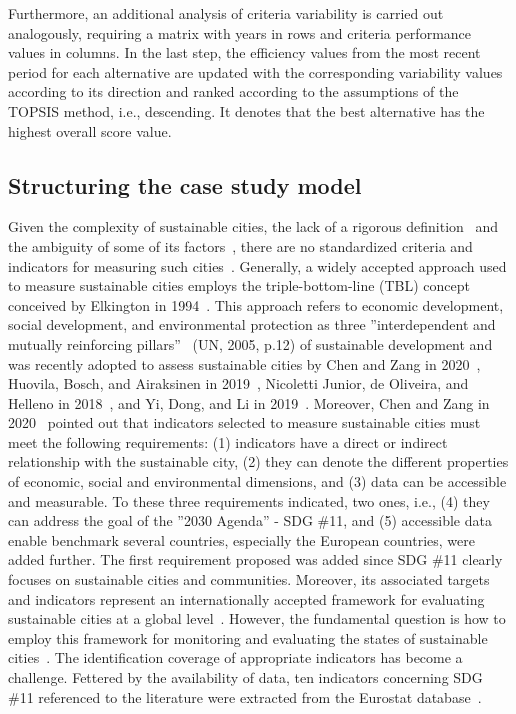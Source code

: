 \documentclass[5p,times]{elsarticle}
\begin{document}
Furthermore, an additional analysis of criteria variability is carried out analogously, requiring a matrix with years in rows and criteria performance values in columns. In the last step, the efficiency values from the most recent period for each alternative are updated with the corresponding variability values according to its direction and ranked according to the assumptions of the TOPSIS method, i.e., descending. It denotes that the best alternative has the highest overall score value.

\subsection{Structuring the case study model}
\label{sec:structuringEurostat}
%
Given the complexity of sustainable cities, the lack of a rigorous definition~\cite{hassan2015paradox} and the ambiguity of some of its factors~\cite{bouzguenda2019towards, phillis2017urban}, there are no standardized criteria and indicators for measuring such cities~\cite{chen2020evaluation}. Generally, a widely accepted approach used to measure sustainable cities employs the triple-bottom-line (TBL) concept conceived by Elkington in 1994~\cite{sitnikov2013triple}. This approach refers to economic development, social development, and environmental protection as three ''interdependent and mutually reinforcing pillars''~\cite{un2005} (UN, 2005, p.12) of sustainable development and was recently adopted to assess sustainable cities by Chen and Zang in 2020~\cite{chen2020evaluation}, Huovila, Bosch, and Airaksinen in 2019~\cite{huovila2019comparative},  Nicoletti Junior, de Oliveira, and Helleno in 2018~\cite{junior2018sustainability}, and Yi, Dong, and Li in 2019~\cite{yi2019evaluation}. Moreover, Chen and Zang in 2020~\cite{chen2020evaluation} pointed out that indicators selected to measure sustainable cities must meet the following requirements: (1) indicators have a direct or indirect relationship with the sustainable city, (2) they can denote the different properties of economic, social and environmental dimensions, and  (3) data can be accessible and measurable. To these three requirements indicated, two ones, i.e., (4) they can address the goal of the ''2030 Agenda'' - SDG \#11, and (5) accessible data enable benchmark several countries, especially the European countries, were added further. The first requirement proposed was added since SDG \#11 clearly focuses on sustainable cities and communities. 
%
Moreover, its associated targets and indicators represent an internationally accepted framework for evaluating sustainable cities at a global level~\cite{un2016b, un2017}. However, the fundamental question is how to employ this framework for monitoring and evaluating the states of sustainable cities~\cite{huovila2019comparative}. The identification coverage of appropriate indicators has become a challenge. Fettered by the availability of data, ten indicators concerning SDG \#11 referenced to the literature were extracted from the Eurostat database~\cite{eurostat2021}. 
\end{document}
